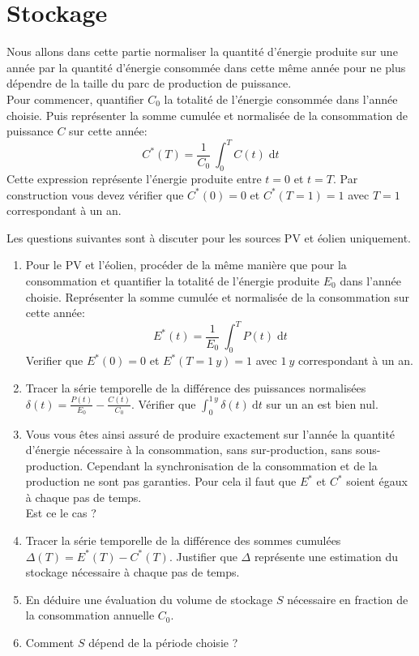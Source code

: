 \documentclass[12pt,a4,french]{article}
\begin{document}
\section{Stockage}
Nous allons dans cette partie normaliser la quantité d'énergie produite sur une année par la quantité d'énergie consommée dans cette même année pour ne plus dépendre de la taille du parc de production de puissance. \\
Pour commencer, quantifier $C_0$ la totalité de l'énergie consommée dans l'année choisie. Puis  représenter la somme cumulée et normalisée de la consommation de puissance $C$ sur cette année:
\begin{equation}
	C^*(T)  = \frac{1}{C_0} ~ \int_{0}^{T}C(t) \; \text{d} t	
\end{equation}
Cette expression représente l'énergie produite entre $t=0$ et $t=T$. Par construction vous devez vérifier que $C^*(0)=0$ et $C^*(T=1)=1$ avec $T=1$ correspondant à un an. 


Les questions suivantes sont à discuter pour les sources PV et éolien uniquement.
\begin{enumerate}
	\item Pour le PV et l'éolien, procéder de la même manière que pour la consommation et quantifier la totalité de l'énergie produite  $E_0$ dans l'année choisie. Représenter la somme cumulée et normalisée de la consommation sur cette année: 
	\begin{equation}
		E^*(t)  = \frac{1}{E_0} ~ \int_{0}^{T} P(t) \; \text{d} t	
	\end{equation}
	Verifier que $E^*(0)=0$ et $E^*(T=1~y)=1$ avec $1~y$ correspondant à un an. 
	
	\item Tracer la série temporelle de la différence des puissances normalisées $\delta(t) = \frac{P(t)}{E_0} - \frac{C(t)}{C_0}$. Vérifier que $\int_0^{1\,y} \delta(t) ~ \text{d} t $ sur un an est bien nul.
	
	\item Vous vous êtes ainsi assuré de produire exactement sur l'année la quantité d'énergie nécessaire à la consommation, sans sur-production, sans sous-production. Cependant la synchronisation de la consommation et de la production ne sont pas garanties. Pour cela il faut que $E^*$ et $C^*$ soient égaux à chaque pas de temps.\\ Est ce le cas ? 
	
	\item Tracer la série temporelle de la différence des sommes cumulées $\Delta(T) = E^*(T) - C^*(T)$. Justifier que $\Delta $ représente une estimation du stockage nécessaire à chaque pas de temps.
	
	\item En déduire une évaluation du volume de stockage $S$ nécessaire en fraction de la consommation annuelle $C_0$.
	
	\item Comment $S$ dépend de la période choisie ?
	
\end{enumerate}
\end{document}

